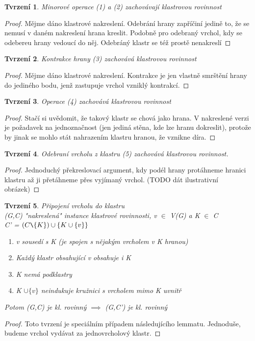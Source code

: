 \documentclass[12pt,a4report]{report}
\newtheorem{tvr}{Tvrzení}[chapter]
\begin{document}
\begin{tvr}
Minorové operace (1) a (2) zachovávají klastrovou rovinnost
\end{tvr}
\begin{proof}
Mějme dáno klastrové nakreslení. Odebrání hrany zapříčiní jedině to, že se nemusí v daném nakreslení hrana kreslit. Podobně pro odebraný vrchol, kdy se odebereu hrany vedoucí do něj. Odebráný klastr se též prostě nenakreslí
\end{proof}

\begin{tvr}
Kontrakce hrany (3) zachovává klastrovou rovinnost
\end{tvr}
\begin{proof}
Mějme dáno klastrové nakreslení. Kontrakce je jen vlastně smrštění hrany do jediného bodu, jenž zastupuje vrchol vzniklý kontrakcí.
\end{proof}

\begin{tvr}
Operace (4) zachovává klastrovou rovinnost
\end{tvr}
\begin{proof}
Stačí si uvědomit, že takový klastr se chová jako hrana. V nakreslené verzi je požadavek na jednoznačnost (jen jediná stěna, kde lze hranu dokreslit), protože by jinak se mohlo stát nahrazením klastru hranou, že vznikne díra.  
\end{proof}

\begin{tvr}
Odebraní vrcholu z klastru (5) zachovává klastrovou rovinnost.
\end{tvr}
\begin{proof}
Jednoduchý překreslovací argument, kdy podél hrany protáhneme hranici klastru až ji přetáhneme přes vyjímaný vrchol. (TODO dát ilustrativní obrázek)
\end{proof}

\begin{tvr} Připojení vrcholu do klastru \\
(G,C) "nakreslená" instance klastrové rovinnosti, v $\in$ V(G) a K $\in$ C \\
C' = $(C \verb=\= \{K\}) \cup \{ K \cup \{v\} \}$
\begin{enumerate}
\item v sousedí s K (je spojen s nějakým vrcholem v K hranou)
\item Každý klastr obsahující v obsahuje i K
\item K nemá podklastry
\item K $\cup \{v\}$ neindukuje kružnici s vrcholem mimo K uvnitř
\end{enumerate}
Potom (G,C) je kl. rovinný $\implies$ (G,C') je kl. rovinný
\end{tvr}
\begin{proof}
Toto tvrzení je speciálním případem následujícího lemmatu. Jednoduše, budeme vrchol vydávat za jednovrcholový klastr.
\end{proof}
\end{document}
